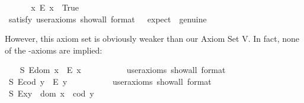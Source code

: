 \begin{isabellebody}
\isadelimproof
\ %
\endisadelimproof
%
\isatagproof
{}\isamarkupfalse%
%
\endisatagproof
{\isafoldproof}%
%
\isadelimproof
%
\endisadelimproof
\isanewline
\ \ \isamarkupfalse%
\ \ {\isachardoublequoteopen}{\isasymexists}x{\isachardot}\ \isactrlbold {\isasymnot}{\isacharparenleft}E\ x{\isacharparenright}{\isachardoublequoteclose}\ \ True\ \ \ %
\ \ \isanewline
\ \ \ \ \isamarkupfalse%
\ {\isacharbrackleft}satisfy{\isacharcomma}\ user{\isacharunderscore}axioms{\isacharcomma}\ show{\isacharunderscore}all{\isacharcomma}\ format\ {\isacharequal}\ {}{\isacharcomma}\ expect\ {\isacharequal}\ genuine{\isacharbrackright}%
\isadelimproof
\ %
\endisadelimproof
%
\isatagproof
{}\isamarkupfalse%
%
\endisatagproof
{\isafoldproof}%
%
\isadelimproof
%
\endisadelimproof
%
\begin{isamarkuptext}%
However, this axiom set is obviously weaker than our Axiom Set V. In fact, none of 
the -axioms are implied:%
\end{isamarkuptext}\isamarkuptrue%
\ \ \isamarkupfalse%
\ S{}{\isacharcolon}\ {\isachardoublequoteopen}E{\isacharparenleft}dom\ x{\isacharparenright}\ \isactrlbold {\isasymrightarrow}\ E\ x{\isachardoublequoteclose}\ \ %
\ \ \isanewline
\ \ \ \ \isamarkupfalse%
\ {\isacharbrackleft}user{\isacharunderscore}axioms{\isacharcomma}\ show{\isacharunderscore}all{\isacharcomma}\ format\ {\isacharequal}\ {}{\isacharbrackright}%
\isadelimproof
\ %
\endisadelimproof
%
\isatagproof
{}\isamarkupfalse%
%
\endisatagproof
{\isafoldproof}%
%
\isadelimproof
%
\endisadelimproof
\ \isanewline
\ \ \isamarkupfalse%
\ S{}{\isacharcolon}\ {\isachardoublequoteopen}E{\isacharparenleft}cod\ y{\isacharparenright}\ \isactrlbold {\isasymrightarrow}\ E\ y{\isachardoublequoteclose}\ \ %
\ \ \isanewline
\ \ \ \ \isamarkupfalse%
\ {\isacharbrackleft}user{\isacharunderscore}axioms{\isacharcomma}\ show{\isacharunderscore}all{\isacharcomma}\ format\ {\isacharequal}\ {}{\isacharbrackright}%
\isadelimproof
\ %
\endisadelimproof
%
\isatagproof
{}\isamarkupfalse%
%
\endisatagproof
{\isafoldproof}%
%
\isadelimproof
%
\endisadelimproof
\ \isanewline
\ \ \isamarkupfalse%
\ S{}{\isacharcolon}\ {\isachardoublequoteopen}E{\isacharparenleft}x{\isasymcdot}y{\isacharparenright}\ \isactrlbold {\isasymleftrightarrow}\ dom\ x\ {\isasymsimeq}\ cod\ y{\isachardoublequoteclose}\ \ \ %

\end{isabellebody}
